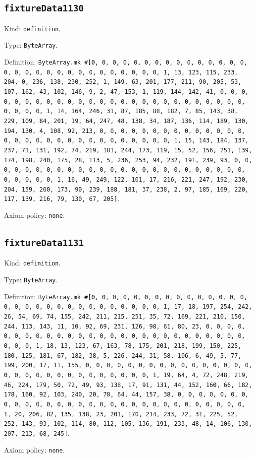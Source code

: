 \documentclass[11pt]{article}
\begin{document}
\subsection*{\texttt{fixtureData1130}}
\noindent Kind: \texttt{definition}.\par
\noindent Type: \texttt{ByteArray}.\par
\noindent Definition: \texttt{ByteArray.mk \#[0, 0, 0, 0, 0, 0, 0, 0, 0, 0, 0, 0, 0, 0, 0, 0, 0, 0, 0, 0, 0, 0, 0, 0, 0, 0, 0, 0, 0, 0, 1, 13, 123, 115, 233, 204, 0, 236, 138, 230, 252, 1, 149, 63, 201, 177, 211, 90, 205, 53, 107, 162, 43, 102, 146, 9, 2, 47, 153, 1, 119, 144, 142, 41, 0, 0, 0, 0, 0, 0, 0, 0, 0, 0, 0, 0, 0, 0, 0, 0, 0, 0, 0, 0, 0, 0, 0, 0, 0, 0, 0, 0, 0, 0, 1, 14, 164, 246, 31, 87, 185, 88, 182, 7, 85, 143, 38, 229, 109, 84, 201, 19, 64, 247, 48, 138, 34, 187, 136, 114, 189, 130, 194, 130, 4, 108, 92, 213, 0, 0, 0, 0, 0, 0, 0, 0, 0, 0, 0, 0, 0, 0, 0, 0, 0, 0, 0, 0, 0, 0, 0, 0, 0, 0, 0, 0, 0, 0, 1, 15, 143, 184, 137, 237, 71, 131, 192, 74, 219, 181, 244, 173, 119, 15, 52, 156, 251, 139, 174, 198, 240, 175, 28, 113, 5, 236, 253, 94, 232, 191, 239, 93, 0, 0, 0, 0, 0, 0, 0, 0, 0, 0, 0, 0, 0, 0, 0, 0, 0, 0, 0, 0, 0, 0, 0, 0, 0, 0, 0, 0, 0, 0, 1, 16, 49, 249, 122, 101, 17, 216, 221, 247, 192, 230, 204, 159, 200, 173, 90, 239, 188, 181, 37, 238, 2, 97, 185, 169, 220, 117, 139, 216, 79, 130, 67, 205]}.\par
\noindent Axiom policy: \texttt{none}.\par
\subsection*{\texttt{fixtureData1131}}
\noindent Kind: \texttt{definition}.\par
\noindent Type: \texttt{ByteArray}.\par
\noindent Definition: \texttt{ByteArray.mk \#[0, 0, 0, 0, 0, 0, 0, 0, 0, 0, 0, 0, 0, 0, 0, 0, 0, 0, 0, 0, 0, 0, 0, 0, 0, 0, 0, 0, 0, 0, 1, 17, 18, 197, 254, 242, 26, 54, 69, 74, 155, 242, 211, 215, 251, 35, 72, 169, 221, 210, 150, 244, 113, 143, 11, 10, 92, 69, 231, 126, 98, 61, 80, 23, 0, 0, 0, 0, 0, 0, 0, 0, 0, 0, 0, 0, 0, 0, 0, 0, 0, 0, 0, 0, 0, 0, 0, 0, 0, 0, 0, 0, 0, 0, 1, 18, 13, 123, 67, 163, 78, 175, 201, 218, 199, 150, 225, 180, 125, 181, 67, 182, 38, 5, 226, 244, 31, 58, 106, 6, 49, 5, 77, 199, 200, 17, 11, 155, 0, 0, 0, 0, 0, 0, 0, 0, 0, 0, 0, 0, 0, 0, 0, 0, 0, 0, 0, 0, 0, 0, 0, 0, 0, 0, 0, 0, 0, 0, 1, 19, 64, 4, 72, 248, 219, 46, 224, 179, 50, 72, 49, 93, 138, 17, 91, 131, 44, 152, 160, 66, 182, 178, 160, 92, 103, 240, 20, 78, 64, 44, 157, 38, 0, 0, 0, 0, 0, 0, 0, 0, 0, 0, 0, 0, 0, 0, 0, 0, 0, 0, 0, 0, 0, 0, 0, 0, 0, 0, 0, 0, 0, 0, 1, 20, 206, 82, 135, 138, 23, 201, 170, 214, 233, 72, 31, 225, 52, 252, 143, 93, 102, 114, 80, 112, 105, 136, 191, 233, 48, 14, 106, 130, 207, 213, 68, 245]}.\par
\noindent Axiom policy: \texttt{none}.\par
\end{document}
